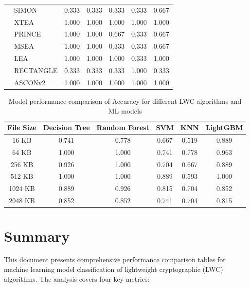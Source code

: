 \documentclass[12pt]{article}
\begin{document}
\begin{table}[h!]
{\begin{tabular}{|c|l|c|c|c|c|c|}
& SIMON & 0.333 & 0.333 & 0.333 & 0.333 & 0.667 \\
& XTEA & 1.000 & 1.000 & 1.000 & 1.000 & 1.000 \\
& PRINCE & 1.000 & 1.000 & 0.667 & 0.333 & 0.667 \\
& MSEA & 1.000 & 1.000 & 0.333 & 0.333 & 0.667 \\
& LEA & 1.000 & 1.000 & 1.000 & 0.333 & 1.000 \\
& RECTANGLE & 0.333 & 0.333 & 0.333 & 1.000 & 0.333 \\
& ASCONv2 & 1.000 & 1.000 & 1.000 & 1.000 & 1.000 \\
\hline
\end{tabular}%
}
\end{table}

\newpage

\begin{table}[h!]
\centering
\caption{Model performance comparison of Accuracy for different LWC algorithms and ML models}
\label{tab:accuracy_comparison}
\begin{tabular}{|c|c|c|c|c|c|}
\hline
\textbf{File Size} & \textbf{Decision Tree} & \textbf{Random Forest} & \textbf{SVM} & \textbf{KNN} & \textbf{LightGBM} \\
\hline
16 KB & 0.741 & 0.778 & 0.667 & 0.519 & 0.889 \\
\hline
64 KB & 1.000 & 1.000 & 0.741 & 0.778 & 0.963 \\
\hline
256 KB & 0.926 & 1.000 & 0.704 & 0.667 & 0.889 \\
\hline
512 KB & 1.000 & 1.000 & 0.889 & 0.593 & 1.000 \\
\hline
1024 KB & 0.889 & 0.926 & 0.815 & 0.704 & 0.852 \\
\hline
2048 KB & 0.852 & 0.852 & 0.741 & 0.704 & 0.815 \\
\hline
\end{tabular}
\end{table}

\section{Summary}

This document presents comprehensive performance comparison tables for machine learning model classification of lightweight cryptographic (LWC) algorithms. The analysis covers four key metrics:
\end{document}
